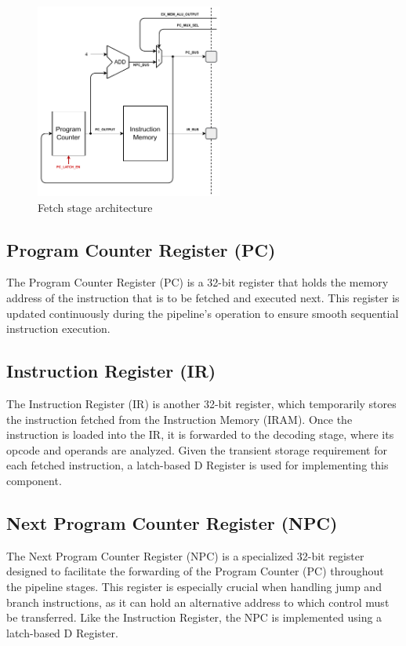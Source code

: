 \begin{figure}[!htbp]
    \centering
    \includegraphics[width=0.55\textwidth]{source/figures/01_fetch.pdf}
    \caption{Fetch stage architecture}
    \label{fig:01_fetch}
\end{figure}

\subsection{Program Counter Register (PC)}
The Program Counter Register (PC) is a 32-bit register that holds the memory address of the instruction that is to be fetched and executed next. This register is updated continuously during the pipeline's operation to ensure smooth sequential instruction execution.

\subsection{Instruction Register (IR)}
The Instruction Register (IR) is another 32-bit register, which temporarily stores the instruction fetched from the Instruction Memory (IRAM). Once the instruction is loaded into the IR, it is forwarded to the decoding stage, where its opcode and operands are analyzed. Given the transient storage requirement for each fetched instruction, a latch-based D Register is used for implementing this component.

\subsection{Next Program Counter Register (NPC)}
The Next Program Counter Register (NPC) is a specialized 32-bit register designed to facilitate the forwarding of the Program Counter (PC) throughout the pipeline stages. This register is especially crucial when handling jump and branch instructions, as it can hold an alternative address to which control must be transferred. Like the Instruction Register, the NPC is implemented using a latch-based D Register.

